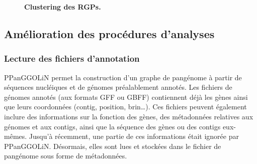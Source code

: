 \begin{figure}[htbp]
    \centering
    \hfill
    \caption[Clustering des RGPs]{\textbf{Clustering des RGPs.}}
    \label{fig:rgpcluster}
\end{figure}

\subsection{Amélioration des procédures d'analyses}

\subsubsection{Lecture des fichiers d'annotation}

PPanGGOLiN permet la construction d'un graphe de pangénome à partir de séquences nucléiques et de génomes préalablement annotés. Les fichiers de génomes annotés (aux formats GFF ou GBFF) contiennent déjà les gènes ainsi que leurs coordonnées (contig, position, brin\dots). Ces fichiers peuvent également inclure des informations sur la fonction des gènes, des métadonnées relatives aux génomes et aux contigs, ainsi que la séquence des gènes ou des contigs eux-mêmes. Jusqu'à récemment, une partie de ces informations était ignorée par PPanGGOLiN. Désormais, elles sont lues et stockées dans le fichier de pangénome sous forme de métadonnées.

